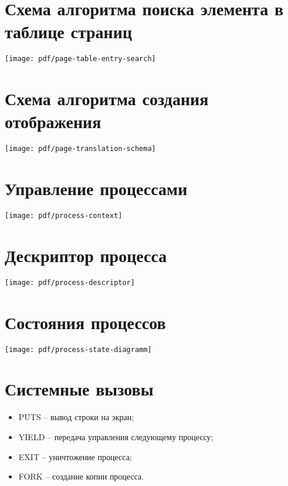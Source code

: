 \documentclass[12pt]{article}
\begin{document}
\section{\textbf{Схема алгоритма поиска элемента в таблице страниц}}
\begin{center}
\texttt{[image: pdf/page-table-entry-search]}
\end{center}


\section{\textbf{Схема алгоритма создания отображения}}
\begin{center}
\texttt{[image: pdf/page-translation-schema]}
\end{center}


\section{\textbf{Управление процессами}}
\begin{center}
\texttt{[image: pdf/process-context]}
\end{center}


\section{\textbf{Дескриптор процесса}}
\begin{center}
\texttt{[image: pdf/process-descriptor]}
\end{center}


\section{\textbf{Состояния процессов}}
\begin{center}
\texttt{[image: pdf/process-state-diagramm]}
\end{center}


\section{\textbf{Системные вызовы}}
\begin{itemize}
\item PUTS -- вывод строки на экран;
\item YIELD -- передача управления следующему процессу;
\item EXIT -- уничтожение процесса;
\item FORK -- создание копии процесса.
\end{itemize}
\end{document}

